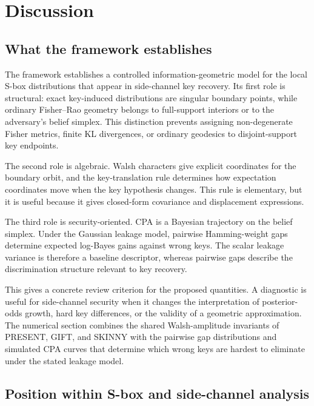 \section{Discussion}\label{sec:discussion}

\subsection{What the framework establishes}

The framework establishes a controlled information-geometric model for the
local S-box distributions that appear in side-channel key recovery.  Its first
role is structural: exact key-induced distributions are singular boundary
points, while ordinary Fisher--Rao geometry belongs to full-support interiors
or to the adversary's belief simplex.  This distinction prevents assigning
non-degenerate Fisher metrics, finite KL divergences, or ordinary geodesics to
disjoint-support key endpoints.

The second role is algebraic.  Walsh characters give explicit coordinates for
the boundary orbit, and the key-translation rule determines how expectation
coordinates move when the key hypothesis changes.  This rule is elementary,
but it is useful because it gives closed-form covariance and displacement
expressions.

The third role is security-oriented.  CPA is a Bayesian trajectory on the
belief simplex.  Under the Gaussian leakage model, pairwise Hamming-weight gaps
determine expected log-Bayes gains against wrong keys.  The scalar leakage
variance is therefore a baseline descriptor, whereas pairwise gaps describe
the discrimination structure relevant to key recovery.

This gives a concrete review criterion for the proposed quantities.  A
diagnostic is useful for side-channel security when it changes the
interpretation of posterior-odds growth, hard key differences, or the validity
of a geometric approximation.  The numerical section combines the shared
Walsh-amplitude invariants of PRESENT, GIFT, and SKINNY with the pairwise gap
distributions and simulated CPA curves that determine which wrong keys are
hardest to eliminate under the stated leakage model.

\subsection{Position within S-box and side-channel analysis}


